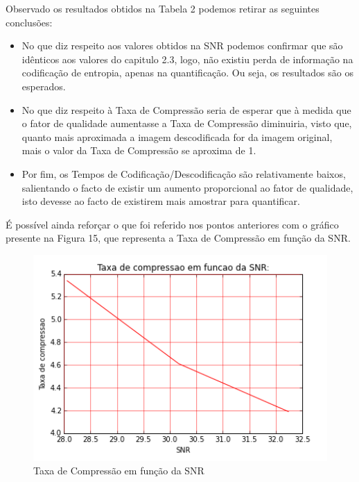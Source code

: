 \documentclass[12pt,a4paper]{article}
\begin{document}
Observado os resultados obtidos na Tabela 2 podemos retirar as seguintes conclusões:
\begin{itemize}
\item No que diz respeito aos valores obtidos na SNR podemos confirmar que são idênticos aos valores do capitulo 2.3, logo, não existiu perda de informação na codificação de entropia, apenas na quantificação. Ou seja, os resultados são os esperados.
\item No que diz respeito à Taxa de Compressão seria de esperar que à medida que o fator de qualidade aumentasse a Taxa de Compressão diminuiria, visto que, quanto mais aproximada a imagem descodificada for da imagem original, mais o valor da Taxa de Compressão se aproxima de 1.
\item Por fim, os Tempos de Codificação/Descodificação são relativamente baixos, salientando o facto de existir um aumento proporcional ao fator de qualidade, isto devesse ao facto de existirem mais amostrar para quantificar.
\end{itemize}

É possível ainda reforçar o que foi referido nos pontos anteriores com o gráfico presente na Figura 15, que representa a Taxa de Compressão em função da SNR.
\newpage
\begin{figure}[h]
	\centering
    \begin{minipage}{0.50\textwidth}
        \centering
        \includegraphics[width=1.2\textwidth]{imagens/graph.png}
    \end{minipage}\hfill
    \caption{Taxa de Compressão em função da SNR}
\end{figure}
\newpage
\end{document}
